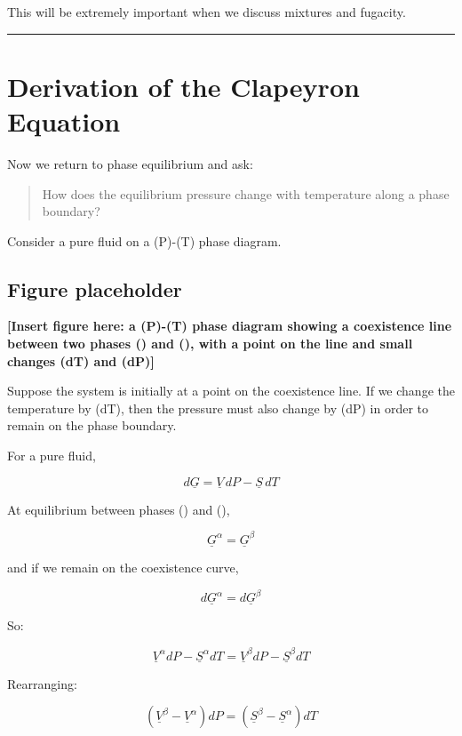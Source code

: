 \documentclass[
  letterpaper,
  DIV=11,
  numbers=noendperiod]{scrartcl}
\begin{document}
This will be extremely important when we discuss mixtures and fugacity.

\begin{center}\rule{0.5\linewidth}{0.5pt}\end{center}

\section{Derivation of the Clapeyron
Equation}\label{derivation-of-the-clapeyron-equation}

Now we return to phase equilibrium and ask:

\begin{quote}
How does the equilibrium pressure change with temperature along a phase
boundary?
\end{quote}

Consider a pure fluid on a (P)-(T) phase diagram.

\subsection{Figure placeholder}\label{figure-placeholder}

\textbf{{[}Insert figure here: a (P)-(T) phase diagram showing a
coexistence line between two phases (\alpha) and (\beta), with a point
on the line and small changes (dT) and (dP){]}}

Suppose the system is initially at a point on the coexistence line. If
we change the temperature by (dT), then the pressure must also change by
(dP) in order to remain on the phase boundary.

For a pure fluid,

\[
d\underline{G} = \underline{V}\,dP - \underline{S}\,dT
\]

At equilibrium between phases (\alpha) and (\beta),

\[
\underline{G}^\alpha = \underline{G}^\beta
\]

and if we remain on the coexistence curve,

\[
d\underline{G}^\alpha = d\underline{G}^\beta
\]

So:

\[
\underline{V}^\alpha dP - \underline{S}^\alpha dT
=
\underline{V}^\beta dP - \underline{S}^\beta dT
\]

Rearranging:

\[
(\underline{V}^\beta - \underline{V}^\alpha)dP
=
(\underline{S}^\beta - \underline{S}^\alpha)dT
\]
\end{document}

